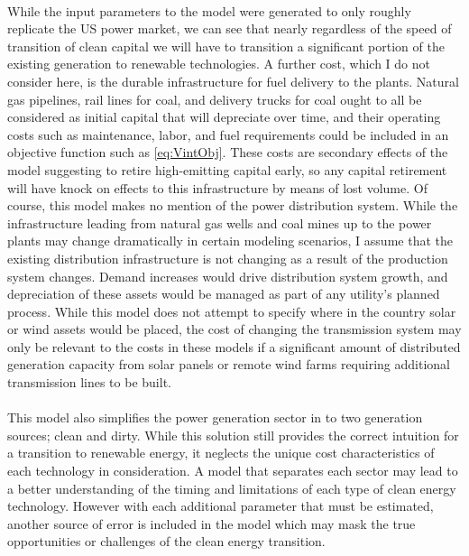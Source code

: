 \documentclass{easychithesis}
\begin{document}
\paragraph{} While the input parameters to the model were generated to only roughly replicate the US power market, we can see that nearly regardless of the speed of transition of clean capital we will have to transition a significant portion of the existing generation to renewable technologies. A further cost, which I do not consider here, is the durable infrastructure for fuel delivery to the plants. Natural gas pipelines, rail lines for coal, and delivery trucks for coal ought to all be considered as initial capital that will depreciate over time, and their operating costs such as maintenance, labor, and fuel requirements could be included in an objective function such as \ref{eq:VintObj}. These costs are secondary effects of the model suggesting to retire high-emitting capital early, so any capital retirement will have knock on effects to this infrastructure by means of lost volume. Of course, this model makes no mention of the power distribution system. While the infrastructure leading from natural gas wells and coal mines up to the power plants may change dramatically in certain modeling scenarios, I assume that the existing distribution infrastructure is not changing as a result of the production system changes. Demand increases would drive distribution system growth, and depreciation of these assets would be managed as part of any utility's planned process. While this model does not attempt to specify where in the country solar or wind assets would be placed, the cost of changing the transmission system may only be relevant to the costs in these models if a significant amount of distributed generation capacity from solar panels or remote wind farms requiring additional transmission lines to be built. 

\paragraph{} This model also simplifies the power generation sector in to two generation sources; clean and dirty. While this solution still provides the correct intuition for a transition to renewable energy, it neglects the unique cost characteristics of each technology in consideration. A model that separates each sector may lead to a better understanding of the timing and limitations of each type of clean energy technology. However with each additional parameter that must be estimated, another source of error is included in the model which may mask the true opportunities or challenges of the clean energy transition. 
\end{document}
